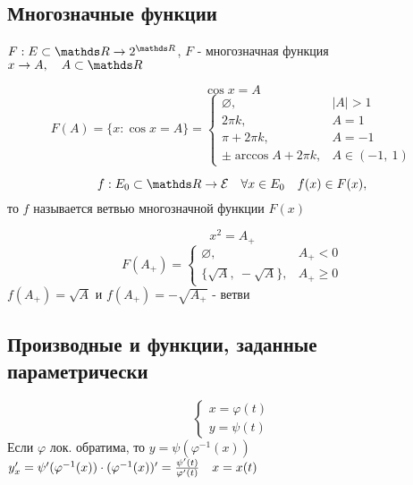 \documentclass[main]{subfiles}
\begin{document}
    \newpage
    \subsection{Многозначные функции}
    \begin{definition}
        $F: E \subset \R \ra 2^{\R}$, $F$ - многозначная функция\\
        $x\ra A,\q A \subset \R$
    \end{definition}

    \begin{Example}
        \[\cos x = A\]
        \[F(A) = \{x: \cos x = A\} = \begin{cases}
            \varnothing, & |A| > 1\\
            2\pi k, & A = 1\\
            \pi + 2\pi k, & A=-1\\
            \pm \arccos A + 2\pi k, & A \in (-1,\ 1)
        \end{cases}\]
    \end{Example}

    \begin{Definition}
        \[f: E_0 \subset \R \ra \E\q \forall x \in E_0 \q f(x) \in F(x),\]
        то $f$ называется ветвью многозначной функции $F(x)$
    \end{Definition}

    \begin{Example}
        \[x^2 = A_+\]
        \[F(A_+) = \begin{cases}
            \varnothing, & A_+ < 0\\
            \{\sqrt{A},\ -\sqrt{A}\}, & A_+ \geq 0
        \end{cases}\]
        $f(A_+) = \sqrt{A}$ и $f(A_+) = -\sqrt{A_+}$ - ветви
    \end{Example}

    \newpage
    \subsection{Производные и функции, заданные параметрически}
    \begin{Utv}
        \[\begin{cases}
            x = \varphi(t)\\
            y = \psi(t)
        \end{cases}\]
        Если $\varphi$ лок. обратима, то $y = \psi(\varphi^{-1}(x))$\\
        $y_x' = \psi'(\varphi^{-1}(x)) \cdot (\varphi^{-1}(x))' = \frac{\psi'(t)}{\varphi'(t)} \quad x = x(t)$
    \end{Utv}
\end{document}
